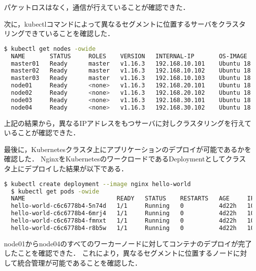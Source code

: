 パケットロスはなく，通信が行えていることが確認できた．

次に，kubectlコマンドによって異なるセグメントに位置するサーバをクラスタリングできていることを確認した．

\begin{lstlisting}[language=bash]
  $ kubectl get nodes -owide
  NAME       STATUS     ROLES    VERSION   INTERNAL-IP       OS-IMAGE             KERNEL-VERSION      CONTAINER-RUNTIME
  master01   Ready      master   v1.16.3   192.168.10.101    Ubuntu 18.04.3 LTS   4.15.0-70-generic   docker://18.9.7
  master02   Ready      master   v1.16.3   192.168.10.102    Ubuntu 18.04.3 LTS   4.15.0-70-generic   docker://18.9.7
  master03   Ready      master   v1.16.3   192.168.10.103    Ubuntu 18.04.3 LTS   4.15.0-70-generic   docker://18.9.7
  node01     Ready      <none>   v1.16.3   192.168.20.101    Ubuntu 18.04.3 LTS   4.15.0-74-generic   docker://18.9.7
  node02     Ready      <none>   v1.16.3   192.168.20.102    Ubuntu 18.04.3 LTS   4.15.0-74-generic   docker://18.9.7
  node03     Ready      <none>   v1.16.3   192.168.30.101    Ubuntu 18.04.3 LTS   4.15.0-74-generic   docker://18.9.7
  node04     Ready      <none>   v1.16.3   192.168.30.102    Ubuntu 18.04.3 LTS   4.15.0-74-generic   docker://18.9.7
\end{lstlisting}

上記の結果から，異なるIPアドレスをもつサーバに対しクラスタリングを行えていることが確認できた．

最後に，Kubernetesクラスタ上にアプリケーションのデプロイが可能であるかを確認した．
NginxをKubernetesのワークロードであるDeploymentとしてクラスタ上にデプロイした結果が以下である．

\begin{lstlisting}[language=bash]
  $ kubectl create deployment --image nginx hello-world
  $ kubectl get pods -owide
  NAME                          READY   STATUS    RESTARTS   AGE     IP          NODE       NOMINATED NODE   READINESS GATES
  hello-world-c6c6778b4-5n74d   1/1     Running   0          4d22h   10.44.0.1   node01     <none>           <none>
  hello-world-c6c6778b4-6mrj4   1/1     Running   0          4d22h   10.42.0.1   node03     <none>           <none>
  hello-world-c6c6778b4-fmnxt   1/1     Running   0          4d22h   10.47.0.1   node02     <none>           <none>
  hello-world-c6c6778b4-r8b5w   1/1     Running   0          4d22h   10.44.0.2   node04   <none>           <none>
\end{lstlisting}

node01からnode04のすべてのワーカーノードに対してコンテナのデプロイが完了したことを確認できた．
これにより，異なるセグメントに位置するノードに対して統合管理が可能であることを確認した．

